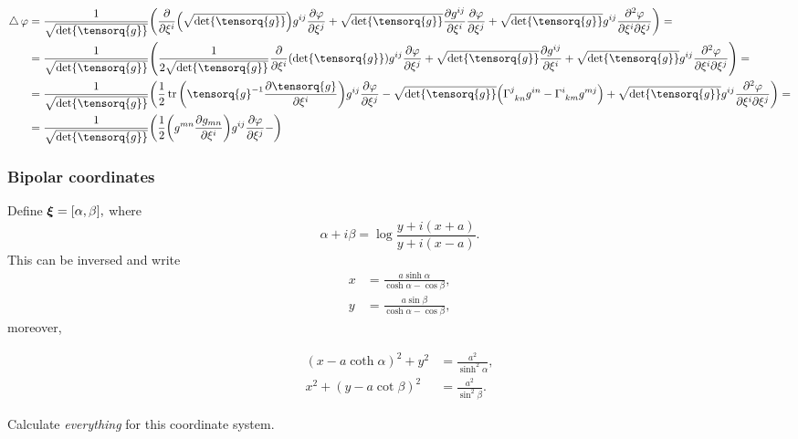 \documentclass[../main.tex]{subfiles}
\begin{document}
\begin{align*}
\laplace \varphi &= \frac{1}{\sqrt{\det \tensorq{g}}}\qty(\pdv{\xi^i}\qty(\sqrt{\det \tensorq{g}})g^{ij}\pdv{\varphi}{\xi^j}+ \sqrt{\det \tensorq{g}} \pdv{g^{ij}}{\xi^i}\pdv{\varphi}{\xi^j}+ \sqrt{\det \tensorq{g}} g^{ij} \pdv[2]{\varphi}{\xi^i}{\xi^j}) = \\
			 &= \frac{1}{\sqrt{\det \tensorq{g}}} \qty(\frac{1}{2\sqrt{\det \tensorq{g}}}\pdv{\xi^i} \qty(\det \tensorq{g})g^{ij}\pdv{\varphi}{\xi^j}+\sqrt{\det \tensorq{g}}\pdv{g^{ij}}{\xi^i}+ \sqrt{\det \tensorq{g}} g^{ij}\pdv[2]{\varphi}{\xi^i}{\xi^j}) = \\
			 & = \frac{1}{\sqrt{\det \tensorq{g}}}\qty(\frac{1}{2}\tr\qty(\inverse{\tensorq{g}} \pdv{\tensorq{g}}{\xi^i})g^{ij}\pdv{\varphi}{\xi^j}-\sqrt{\det \tensorq{g}} \qty(\Gamma \indices{^j_{kn}}g^{in}- \Gamma \indices{^i_{km}}g^{mj})+ \sqrt{\det \tensorq{g}}g^{ij}\pdv[2]{\varphi}{\xi^i}{\xi^j}) = \\
			 & = \frac{1}{\sqrt{\det \tensorq{g}}}\qty(\frac{1}{2}\qty(g^{mn} \pdv{g_{mn}}{\xi^i})g^{ij}\pdv{\varphi}{\xi^j}-)
\end{align*}

\subsubsection{Bipolar coordinates}
\label{sec:bipolar_coordinates}

Define $\vb*{\xi} = [\alpha,\beta],$ where
\[
	\alpha+i \beta = \log \frac{y+i(x+a)}{y+i(x-a)}.
\]
This can be inversed and write
\begin{align*}
	x&=\frac{a \sinh \alpha}{\cosh \alpha - \cos \beta},\\
	y&= \frac{a \sin \beta}{\cosh \alpha -\cos \beta},
\end{align*}
moreover,

\begin{align*}
	(x-a \coth \alpha)^{2}+y^{2} &= \frac{a^{2}}{\sinh^{2}\alpha}, \\
	x^{2}+(y-a \cot \beta)^{2} &= \frac{a^2}{\sin^{2}\beta}.
\end{align*}

Calculate \textit{everything} for this coordinate system.
\end{document}
